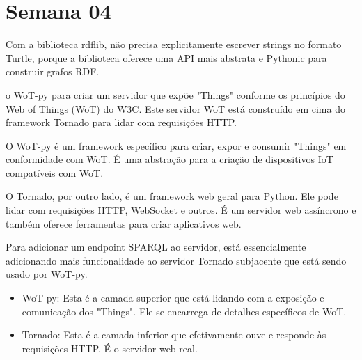 \section{Semana 04}


\begin{nota}
    Com a biblioteca rdflib, não precisa explicitamente escrever strings no formato Turtle, porque a biblioteca oferece uma API mais abstrata e Pythonic para construir grafos RDF.
\end{nota}

o WoT-py para criar um servidor que expõe "Things" conforme os princípios do Web of Things (WoT) do W3C. Este servidor WoT está construído em cima do framework Tornado para lidar com requisições HTTP.

O WoT-py é um framework específico para criar, expor e consumir "Things" em conformidade com WoT. É uma abstração para a criação de dispositivos IoT compatíveis com WoT.

O Tornado, por outro lado, é um framework web geral para Python. Ele pode lidar com requisições HTTP, WebSocket e outros. É um servidor web assíncrono e também oferece ferramentas para criar aplicativos web.

Para adicionar um endpoint SPARQL ao servidor, está essencialmente adicionando mais funcionalidade ao servidor Tornado subjacente que está sendo usado por WoT-py.

\begin{itemize}
    \item WoT-py: Esta é a camada superior que está lidando com a exposição e comunicação dos "Things". Ele se encarrega de detalhes específicos de WoT.
    \item Tornado: Esta é a camada inferior que efetivamente ouve e responde às requisições HTTP. É o servidor web real.
\end{itemize}
